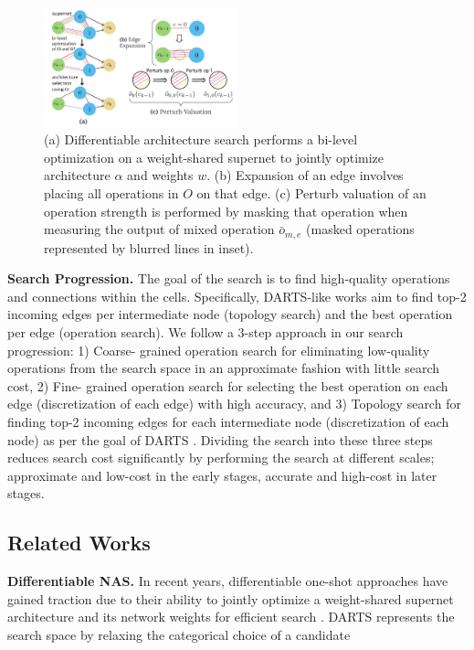 \documentclass[onecolumn]{IEEEtran}
\begin{document}
\begin{figure}[ht]
	\centering
	\includegraphics[width=0.5\textwidth]{Figure-1.png}
    \caption{(a) Differentiable architecture search \cite{Liu2018} performs a bi-level optimization on a weight-shared supernet to jointly optimize architecture \( \alpha \) and weights \( w \). (b) Expansion of an edge involves placing all operations in \( O \) on that edge. (c) Perturb valuation of an operation strength is performed by masking that operation when measuring the output of mixed operation \( \bar{o}_{m,e} \) (masked operations represented by blurred lines in inset).}
	\label{fig:architecture_search}
\end{figure}

\textbf{Search Progression.} The goal of the search is to find high-quality operations and connections within the cells. Specifically, DARTS-like works aim to find top-2 incoming edges per intermediate node (topology search) and the best operation per edge (operation search). We follow a 3-step approach in our search progression: 1) Coarse- grained operation search for eliminating low-quality operations from the search space in an approximate fashion with little search cost, 2) Fine- grained operation search for selecting the best operation on each edge (discretization of each edge) with high accuracy, and 3) Topology search for finding top-2 incoming edges for each intermediate node (discretization of each node) as per the goal of DARTS \cite{Liu2018}. Dividing the search into these three steps reduces search cost significantly by performing the search at different scales; approximate and low-cost in the early stages, accurate and high-cost in later stages.

\subsection{Related Works}
\textbf{Differentiable NAS.} In recent years, differentiable one-shot approaches have gained traction due to their ability to jointly optimize a weight-shared supernet architecture and its network weights for efficient search \cite{Liu2018, Xu2019, Xie2018}. DARTS \cite{Liu2018} represents the search space by relaxing the categorical choice of a candidate
\end{document}
